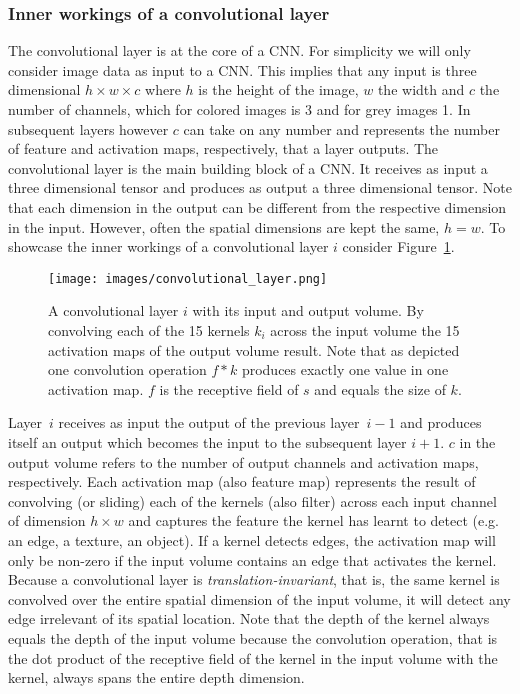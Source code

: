 \documentclass[12pt,a4paper]{article}
\begin{document}
\subsubsection{Inner workings of a convolutional layer}\label{subsec:innerworkconvl}
The convolutional layer is at the core of a CNN. For simplicity we will only consider image data as input to a CNN. This implies that any input is three dimensional $h \times w \times c$ where $h$ is the height of the image, $w$ the width and $c$ the number of channels, which for colored images is 3 and for grey images 1.  In subsequent layers however $c$ can take on any number and represents the number of feature and activation maps, respectively, that a layer outputs. The convolutional layer is the main building block of a CNN. It receives as input a three dimensional tensor and produces as output a three dimensional tensor. Note that each dimension in the output can be different from the respective dimension in the input. However, often the spatial dimensions are kept the same, $h = w$. To showcase the inner workings of a convolutional layer $i$ consider Figure~\ref{fig:conv_layer}. 
\begin{figure}[ht]
\centering
\texttt{[image: images/convolutional\_layer.png]}
\caption{A convolutional layer $i$ with its input and output volume. By convolving each of the 15 kernels $k_i$ across the input volume the 15 activation maps of the output volume result. Note that as depicted one convolution operation $f * k$ produces exactly one value in one activation map. $f$ is the receptive field of $s$ and equals the size of $k$.}
\label{fig:conv_layer}
\end{figure}
Layer~$i$ receives as input the output of the previous layer~$i-1$ and produces itself an output which becomes the input to the subsequent layer $i+1$. $c$ in the output volume refers to the number of output channels and activation maps, respectively. Each activation map (also feature map) represents the result of convolving (or sliding) each of the kernels (also filter) across each input channel of dimension $h \times w$ and captures the feature the kernel has learnt to detect (e.g. an edge, a texture, an object). If a kernel detects edges, the activation map will only be non-zero if the input volume contains an edge that activates the kernel. Because a convolutional layer is \textit{translation-invariant}, that is, the same kernel is convolved over the entire spatial dimension of the input volume, it will detect any edge irrelevant of its spatial location. Note that the depth of the kernel always equals the depth of the input volume because the convolution operation, that is the dot product of the receptive field of the kernel in the input volume with the kernel, always spans the entire depth dimension. 
\end{document}
